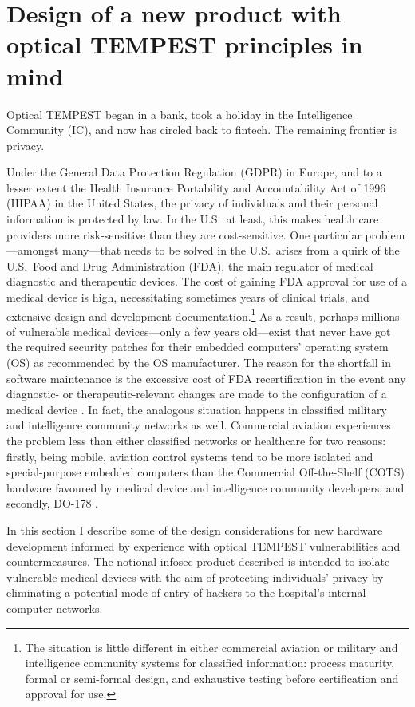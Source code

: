 \documentclass[conference]{IEEEtran}
\begin{document}
\section{Design of a new product with optical TEMPEST principles in mind}

Optical TEMPEST began in a bank, took a holiday in the Intelligence Community
(IC), and now has circled back to fintech. The remaining frontier is privacy.

Under the General Data Protection Regulation (GDPR) in Europe, and to a
lesser extent the Health Insurance Portability and Accountability Act of 1996
(HIPAA) in the United States, the privacy of individuals and their personal
information is protected by law. In the U.S.\ at least, this makes health
care providers more risk-sensitive than they are cost-sensitive. One
particular problem---amongst many---that needs to be solved in the U.S.\
arises from a quirk of the U.S.\ Food and Drug Administration (FDA), the main
regulator of medical diagnostic and therapeutic devices. The cost of gaining
FDA approval for use of a medical device is high, necessitating sometimes
years of clinical trials, and extensive design and development
documentation.\footnote{The situation is little different in either
commercial aviation or military and intelligence community systems for
classified information: process maturity, formal or semi-formal design, and
exhaustive testing before certification and approval for use.} As a result,
perhaps millions of vulnerable medical devices---only a few years old---exist
that never have got the required security patches for their embedded
computers' operating system (OS) as recommended by the OS manufacturer. The
reason for the shortfall in software maintenance is the excessive cost of FDA
recertification in the event any diagnostic- or therapeutic-relevant changes
are made to the configuration of a medical device \cite{Talbot2012}. In fact,
the analogous situation happens in classified military and intelligence
community networks as well. Commercial aviation experiences the problem less
than either classified networks or healthcare for two reasons: firstly, being
mobile, aviation control systems tend to be more isolated and special-purpose
embedded computers than the Commercial Off-the-Shelf (COTS) hardware favoured
by medical device and intelligence community developers; and secondly, DO-178
\cite{DO-178C}.

In this section I describe some of the design considerations for new hardware
development informed by experience with optical TEMPEST vulnerabilities and
countermeasures. The notional infosec product described is intended to
isolate vulnerable medical devices with the aim of protecting individuals'
privacy by eliminating a potential mode of entry of hackers to the hospital's
internal computer networks.
\end{document}
